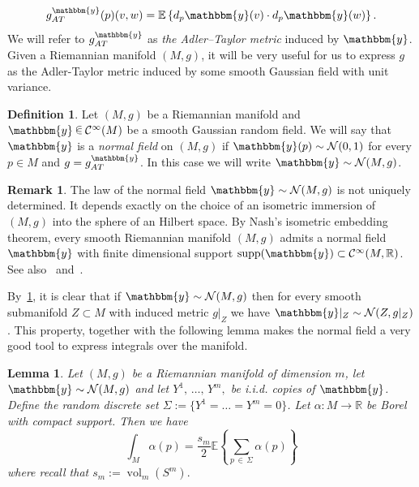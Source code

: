 \documentclass[10pt]{amsart}
\newtheorem{lemm}[theo]{Lemma}\newtheorem{prop}[theo]{Proposition}\newtheorem{coro}[theo]{Corollary}\newtheorem{conj}[theo]{Conjecture}
\theoremstyle{definition}\newtheorem{defi}[theo]{Definition}\newtheorem{rema}[theo]{Remark}\newtheorem{exam}[theo]{Example}\newtheorem{exem}[theo]{Example}\newtheorem{nota}[theo]{Notation}
\newcommand{\R}{\mathbb{R}}
\newcommand{\EE}{\mathbb{E}}
\DeclareMathOperator{\vol}{vol}
\newcommand{\y}{\mathbbm{y}}
\newcommand{\mC}{\mathcal{C}}
\newcommand{\clN}{\mathcal{N}}
\renewcommand{\a}{\alpha}
\newcommand*\randin{
\mathchoice {\raisebox{-.35ex}{$\displaystyle{^\subset}$}\mkern-11.5mu\raisebox{+.45ex}{$\displaystyle{_\subset}$}} {\mkern+1mu\raisebox{-.27ex}{$\textstyle{^\subset}$}\mkern-11.7mu\raisebox{+.45ex}{$\textstyle{_\subset}$}} {\raisebox{.35ex}{$\scriptstyle\subset$}\mkern-14mu\raisebox{-.15ex}{$\scriptstyle\subset$}} {\raisebox{.3ex}{$\scriptscriptstyle\subset$}\mkern-13.5mu\raisebox{-.10ex}{$\scriptscriptstyle\subset$}}}
\begin{document}
\begin{equation}\label{eq:ATmetric}
g^\y_{AT}(p)(v,w)=\EE\left\{d_p\y(v)\cdot d_p\y(w)\right\}.
\end{equation}
We will refer to $g_{AT}^\y$ as \emph{the Adler--Taylor metric} induced by $\y$. Given a Riemannian manifold $(M,g)$, it will be very useful for us to express $g$ as the Adler-Taylor metric induced by some smooth Gaussian field with unit variance.

\begin{defi}\label{def:ATfield}
Let $(M,g)$ be a Riemannian manifold and $\y\,\randin\, \mC^\infty(M)$ be a smooth Gaussian random field. We will say that $\y$ is a \emph{normal field} on $(M,g)$ if $\y(p)\sim \clN(0,1)$ for every $p\in M$ and $g=g^\y_{AT}$. In this case we will write $\y\sim \clN(M,g)$.
\end{defi}

\begin{rema}
The law of the normal field $\y\sim \clN(M,g)$ is not uniquely determined. It depends exactly on the choice of an isometric immersion of $(M,g)$ into the sphere of an Hilbert space. By Nash's isometric embedding theorem, every smooth Riemannian manifold $(M,g)$ admits a normal field $\y$ with finite dimensional support $\text{supp}(\y)\subset\mC^\infty(M,\R)$. See also~\cite{AdlerTaylor} and~\cite{Nicolaescu2016}.
\end{rema}

By~\cref{def:ATfield}, it is clear that if $\y\sim \clN(M,g)$ then for every smooth submanifold $Z\subset M$ with induced metric $g|_Z$ we have $\y|_Z\sim \clN(Z,g|_Z)$. This property, together with the following lemma makes the normal field a very good tool to express integrals over the manifold.

\begin{lemm}\label{lem:Montecarlo}
Let $(M,g)$ be a Riemannian manifold of dimension $m$, let $\y\sim\clN(M,g)$ and let $Y^1,\,\ldots,\,Y^m,$ be i.i.d. copies of $\y$. Define the random discrete set $\Sigma:=\{Y^1=\dots =Y^m=0\}$. Let $\a\colon M\to \R$ be Borel with compact support. Then we have
\begin{equation*}
\int_M\a(p)=\frac{s_m}{2}\EE\left\{\sum_{p\,\in\,\Sigma}\a(p)\right\}
\end{equation*}
where recall that $s_m:=\vol_m(S^m).$
\end{lemm}
\end{document}
